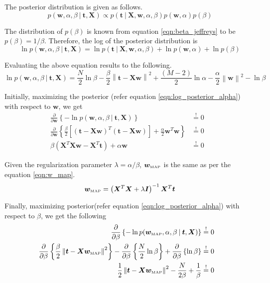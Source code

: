 \documentclass[11pt]{article}
\newcommand{\eye}{\bm{I}}
\newcommand{\map}[1]{{#1}_{\text{\tiny MAP}}}
\newcommand\given[1][]{\:#1\vert\:}
\newcommand{\norm}[1]{\left\lVert#1\right\rVert}
\begin{document}
The posterior distribution is given as follows.
\begin{equation}
    p(\bm{w}, \alpha, \beta \given \bm{t}, \bm{X}) \propto p(\bm{t} \given \bm{X}, \bm{w}, \alpha, \beta) p(\bm{w}, \alpha) p(\beta)
\end{equation}

The distribution of $p(\beta)$ is known from equation \ref{eqn:beta_jeffreys} to be $p(\beta) = 1/\beta$. Therefore, the log of the posterior distribution is
\begin{equation}
    \ln{p(\bm{w}, \alpha, \beta \given \bm{t}, \bm{X})} = \ln{p(\bm{t} \given \bm{X}, \bm{w}, \alpha, \beta)} + \ln{p(\bm{w}, \alpha)} + \ln{p(\beta)}
\end{equation}

Evaluating the above equation results to the following.
\begin{equation} \label{eqn:log_posterior_alpha}
    \ln{p(\bm{w}, \alpha, \beta \given \bm{t}, \bm{X})} = \frac{N}{2}\ln{\beta}  - \frac{\beta}{2} \norm{\bm{t} - \bm{Xw}}^2 + \frac{\left(M-2\right)}{2} \ln{\alpha} - \frac{\alpha}{2}\norm{\bm{w}}^2 - \ln{\beta}
\end{equation}

Initially, maximizing the posterior (refer equation \ref{eqn:log_posterior_alpha}) with respect to $\bm{w}$, we get
\begin{eqnarray}
    \frac{\partial }{\partial  \bm{w}} \left\{ -\ln{p(\bm{w}, \alpha, \beta \given \bm{t}, \bm{X})} \right\} 
    &\overset{!}{=} 0& \\
    \frac{\partial }{\partial \bm{w}} \left\{\frac{\beta}{2} \left[ \left(\bm{t} - \bm{X}\bm{w}\right)^T \left(\bm{t} - \bm{X}\bm{w}\right)\right] + \frac{\alpha}{2}\bm{w}^T\bm{w}\right\}
    &\overset{!}{=} 0& \\
    \beta \left( \bm{X}^T\bm{X}\bm{w} - \bm{X}^T \bm{t} \right) + \alpha\bm{w}
    &\overset{!}{=} 0& 
\end{eqnarray}

Given the regularization parameter $\lambda = \alpha/\beta$, $\map{\bm{w}}$ is the same as per the equation \ref{eqn:w_map}.
\begin{equation}
    \map{\bm{w}} = \left(\bm{X}^T\bm{X} + \lambda\eye\right)^{-1}\bm{X}^T\bm{t}
\end{equation}

Finally, maximizing posterior(refer equation \ref{eqn:log_posterior_alpha}) with respect to $\beta$, we get the following
\begin{eqnarray}
    \frac{\partial }{\partial  \beta} \left\{ -\ln{p(\map{\bm{w}}, \alpha, \beta \given \bm{t}, \bm{X})} \right\} 
    &\overset{!}{=} 0& \\
    \frac{\partial }{\partial \beta} \left\{\frac{\beta}{2} \norm{\bm{t} - \bm{X}\map{\bm{w}}}^2 \right\}
    - \frac{\partial }{\partial \beta} \left\{\frac{N}{2}\ln{\beta} \right\} + \frac{\partial }{\partial \beta} \left\{ \ln{\beta} \right\}
    &\overset{!}{=} 0& \\
    \frac{1}{2} \norm{\bm{t} - \bm{X}\map{\bm{w}}}^2 - \frac{N}{2\beta} + \frac{1}{\beta}
    &\overset{!}{=} 0&
\end{eqnarray}
\end{document}
